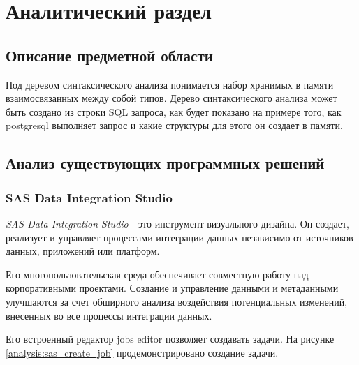 
\chapter{Аналитический раздел}
\label{cha:analysis}

\section{Описание предметной области}

Под деревом синтаксического анализа понимается набор хранимых 
в памяти взаимосвязанных между собой типов. 
Дерево синтаксического анализа может быть создано из строки SQL запроса,
как будет показано на примере того, как postgresql выполняет запрос и какие 
структуры для этого он создает в памяти. 

\section{Анализ существующих программных решений}

\subsection{SAS Data Integration Studio}

\textit{SAS Data Integration Studio \cite{bib2}} - это инструмент визуального дизайна. 
Он создает, реализует и управляет процессами интеграции данных независимо от источников данных, приложений или платформ.

Его многопользовательская среда обеспечивает совместную работу над корпоративными проектами.
Создание и управление данными и метаданными улучшаются за счет обширного анализа воздействия потенциальных изменений, внесенных во все процессы интеграции данных.

Его встроенный редактор jobs editor позволяет создавать задачи.
На рисунке \ref{analysis:sas_create_job} продемонстрировано создание задачи.

\begin{figure}[ht!]
\end{figure}

